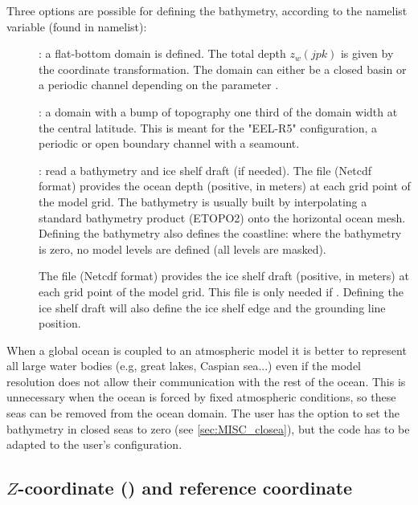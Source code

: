 \documentclass[../main/NEMO_manual]{subfiles}
\begin{document}
Three options are possible for defining the bathymetry, according to the namelist variable 
(found in  namelist): 
\begin{description}
\item[]:
  a flat-bottom domain is defined.
  The total depth $z_w (jpk)$ is given by the coordinate transformation.
  The domain can either be a closed basin or a periodic channel depending on the parameter . 
\item[]:
  a domain with a bump of topography one third of the domain width at the central latitude.
  This is meant for the "EEL-R5" configuration, a periodic or open boundary channel with a seamount. 
\item[]:
  read a bathymetry and ice shelf draft (if needed).
  The  file (Netcdf format) provides the ocean depth (positive, in meters) at
  each grid point of the model grid.
  The bathymetry is usually built by interpolating a standard bathymetry product (\eg ETOPO2) onto
  the horizontal ocean mesh.
  Defining the bathymetry also defines the coastline: where the bathymetry is zero,
  no model levels are defined (all levels are masked).

  The  file (Netcdf format) provides the ice shelf draft (positive, in meters) at
  each grid point of the model grid.
  This file is only needed if .
  Defining the ice shelf draft will also define the ice shelf edge and the grounding line position.
\end{description}

When a global ocean is coupled to an atmospheric model it is better to represent all large water bodies
(e.g, great lakes, Caspian sea...)
even if the model resolution does not allow their communication with the rest of the ocean.
This is unnecessary when the ocean is forced by fixed atmospheric conditions,
so these seas can be removed from the ocean domain.
The user has the option to set the bathymetry in closed seas to zero (see \autoref{sec:MISC_closea}),
but the code has to be adapted to the user's configuration. 

\subsection[$Z$-coordinate (\protect\np{ln\_zco}\forcode{ = .true.}) and ref. coordinate]
				{$Z$-coordinate (\protect{}) and reference coordinate}
\label{subsec:DOM_zco}
\end{document}
